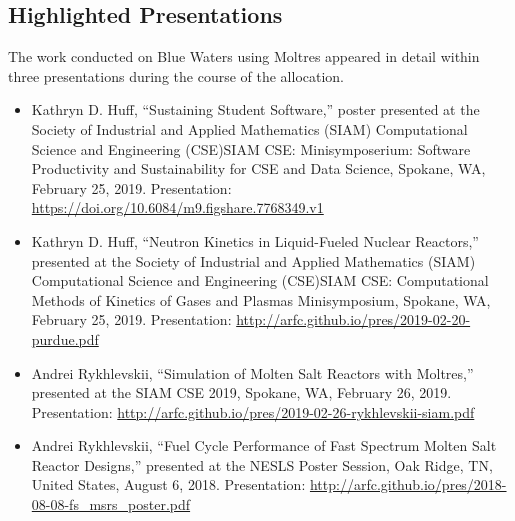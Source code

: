 \documentclass[letterpaper]{article}
\begin{document}
\subsection{Highlighted Presentations} The work conducted on Blue Waters using 
Moltres appeared in detail within three presentations during the course of the 
allocation. 

\begin{itemize} 
        \item Kathryn D. Huff, ``Sustaining Student Software,'' poster 
                presented at  
                the Society of Industrial and Applied 
                Mathematics (SIAM) Computational Science and Engineering 
                (CSE)SIAM CSE: Minisymposerium: Software Productivity and 
                Sustainability for CSE and Data Science, Spokane, WA, February 25, 2019.
                Presentation: 
                \url{https://doi.org/10.6084/m9.figshare.7768349.v1}
        \item Kathryn D. Huff, ``Neutron Kinetics in Liquid-Fueled Nuclear 
                Reactors,'' presented at 
                the Society of Industrial and Applied 
                Mathematics (SIAM) Computational Science and Engineering 
                (CSE)SIAM CSE: Computational Methods of Kinetics of Gases and 
                Plasmas Minisymposium, Spokane, WA, February 25, 2019.
                Presentation: \url{http://arfc.github.io/pres/2019-02-20-purdue.pdf}
        \item Andrei Rykhlevskii, ``Simulation of Molten Salt Reactors with 
                Moltres,'' presented at the SIAM CSE 2019, Spokane, WA, 
                February 26, 2019. 
                Presentation: \url{http://arfc.github.io/pres/2019-02-26-rykhlevskii-siam.pdf}
        \item Andrei Rykhlevskii, ``Fuel Cycle Performance of Fast Spectrum Molten Salt Reactor Designs,'' presented at the NESLS Poster Session, Oak Ridge, TN, United States, August 6, 2018.  Presentation: \url{http://arfc.github.io/pres/2018-08-08-fs_msrs_poster.pdf}


\end{itemize}
\end{document}
